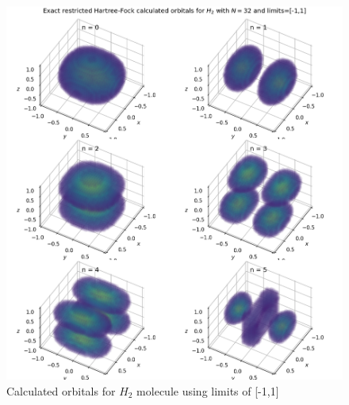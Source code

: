 \documentclass[10pt, oneside, letterpaper]{article}
\begin{document}
\begin{figure}[H]
  \begin{center}
    \includegraphics[scale=0.75]{h2_N32_l1.png}
  \end{center}
  \caption{Calculated orbitals for $H_2$ molecule using limits of [-1,1]}
  \label{h2-plot-l1}
\end{figure}
\end{document}
